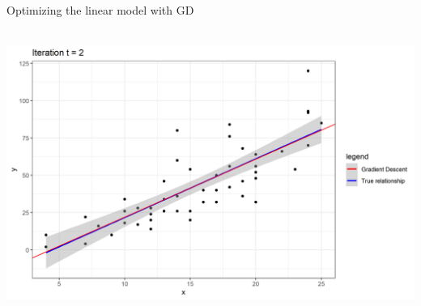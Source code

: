 \documentclass[11pt,compress,t,notes=noshow, xcolor=table]{beamer}
\begin{document}
\begin{vbframe}{Optimizing the linear model with GD}
	\begin{center}
	$ $ \\
	\includegraphics[width=\textwidth]{figure_man/iter2.png}\\
	\begin{footnotesize}
	\end{footnotesize}
	\end{center}

\end{vbframe}

\endlecture
\end{document}
